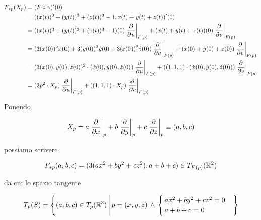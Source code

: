 {\begin{align}
	\begin{split}
		F_{*p}(X_{p}) &= (F \circ \gamma)' (0) \\
		&= ((x(t))^{3} + (y(t))^{3} + (z(t))^{3} - 1, x(t) + y(t) + z(t))' (0) \\
		&= \dot{ ((x(t))^{3} + (y(t))^{3} + (z(t))^{3} - 1) } (0) \eval{ \pdv{u} }_{F(p)} + \dot{ (x(t) + y(t) + z(t)) } (0) \eval{ \pdv{v} }_{F(p)} \\
		&= (3 (x(0))^{2} \dot{x}(0) + 3 (y(0))^{2} \dot{y}(0) + 3 (z(0))^{2} \dot{z}(0)) \eval{ \pdv{u} }_{F(p)} + (\dot{x}(0) + \dot{y}(0) + \dot{z}(0)) \eval{ \pdv{v} }_{F(p)} \\
		&= ( 3 (x(0), y(0), z(0))^{2} \cdot (\dot{x}(0), \dot{y}(0), \dot{z}(0)) \eval{ \pdv{u} }_{F(p)} + ( (1,1,1) \cdot (\dot{x}(0), \dot{y}(0), \dot{z}(0)) ) \eval{ \pdv{v} }_{F(p)} \\
		&= ( 3 p^{2} \cdot X_{p} ) \eval{ \pdv{u} }_{F(p)} + ( (1,1,1) \cdot X_{p} ) \eval{ \pdv{v} }_{F(p)}
	\end{split}
\end{align}

Ponendo

\begin{equation}
	X_{p} = a \eval{ \pdv{x} }_{p} + b \eval{ \pdv{y} }_{p} + c \eval{ \pdv{z} }_{p} %
	\equiv (a,b,c)
\end{equation}

possiamo scrivere

\begin{equation}
	F_{*p}(a,b,c) = ( 3 (a x^{2} + b y^{2} + c z^{2}), a + b + c ) \in T_{F(p)}(\mathbb{R}^{2})
\end{equation}

da cui lo spazio tangente

\begin{equation}
	T_{p}(S) = \left\{ (a,b,c) \in T_{p}(\R^{3}) \st p = (x,y,z) \, \wedge \, %
	\begin{cases}
		a x^{2} + b y^{2} + c z^{2} = 0 \\
		a + b + c = 0
	\end{cases} %
	\right\}
\end{equation}
}


